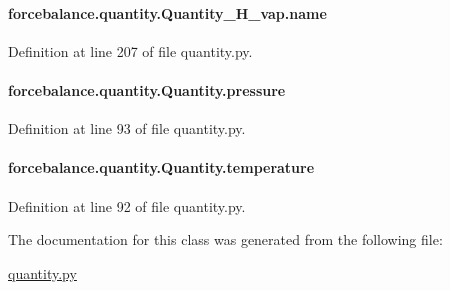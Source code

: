 \hypertarget{classforcebalance_1_1quantity_1_1Quantity__H__vap_a086f08ed40f4c6c3967ee3e36c1100a7}{
\paragraph[{name}]{\setlength{\rightskip}{0pt plus 5cm}forcebalance.\-quantity.\-Quantity\-\_\-\-H\-\_\-vap.\-name}}\label{classforcebalance_1_1quantity_1_1Quantity__H__vap_a086f08ed40f4c6c3967ee3e36c1100a7}


Definition at line 207 of file quantity.\-py.

\hypertarget{classforcebalance_1_1quantity_1_1Quantity_a972fbe22434f2aedca70addaed1a0bea}{
\paragraph[{pressure}]{\setlength{\rightskip}{0pt plus 5cm}forcebalance.\-quantity.\-Quantity.\-pressure\hspace{0.3cm}{\ttfamily [inherited]}}}\label{classforcebalance_1_1quantity_1_1Quantity_a972fbe22434f2aedca70addaed1a0bea}


Definition at line 93 of file quantity.\-py.

\hypertarget{classforcebalance_1_1quantity_1_1Quantity_a30da0699f09b247b74014a9a1a6a2d09}{
\paragraph[{temperature}]{\setlength{\rightskip}{0pt plus 5cm}forcebalance.\-quantity.\-Quantity.\-temperature\hspace{0.3cm}{\ttfamily [inherited]}}}\label{classforcebalance_1_1quantity_1_1Quantity_a30da0699f09b247b74014a9a1a6a2d09}


Definition at line 92 of file quantity.\-py.



The documentation for this class was generated from the following file\-:\begin{DoxyCompactItemize}
\item 
\hyperlink{quantity_8py}{quantity.\-py}\end{DoxyCompactItemize}
